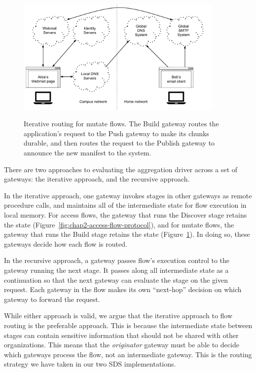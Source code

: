 \begin{figure}[h]
   \caption{Iterative routing for mutate flows.  The Build gateway routes the
   application's request to the Push gateway to make its chunks durable, and
   then routes the request to the Publish gateway to announce the new manifest
   to the system.}
   \centering
   \includegraphics[width=0.9\textwidth,page=10]{figures/dissertation-figures}
   \label{fig:chap2-mutate-flow-protocol}
\end{figure}

There are two approaches to evaluating the aggregation driver across a set of
gateways:  the iterative approach, and the recursive approach.

In the iterative approach, one gateway invokes stages in other gateways as
remote procedure calls, and maintains all of the intermediate state for flow
execution in local memory.  For access flows, the gateway that runs the Discover
stage retains the state (Figure~\ref{fig:chap2-access-flow-protocol}), and for
mutate flows, the gateway that runs the Build stage retains the state
(Figure~\ref{fig:chap2-mutate-flow-protocol}).  In doing so, these gateways
decide how each flow is routed.

In the recursive approach, a gateway passes flow's execution
control to the gateway running the next stage.  It passes along all intermediate
state as a continuation so that the next gateway can evaluate the stage on the
given request.  Each gateway in the flow makes its own
``next-hop'' decision on which gateway to forward the request.

While either approach is valid, we argue that the iterative approach to flow
routing is the preferable approach.  This is because the intermediate state between
stages can contain sensitive information that should not be shared with other
organizations.  This means that the \emph{originator} gateway must be able
to decide which gateways process the flow, not an intermediate gateway.
This is the routing strategy we have taken in our two SDS
implementations.

